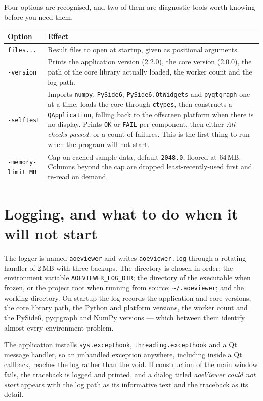 \documentclass[11pt,a4paper,oneside]{report}
\newcommand{\appver}{2.2.0}
\newcommand{\code}[1]{\texttt{#1}}
\begin{document}
Four options are recognised, and two of them are diagnostic tools worth knowing
before you need them.

\begin{center}
\small
\begin{tabular}{@{}p{}p{}@{}}
\toprule
\textbf{Option} & \textbf{Effect} \\
\midrule
\code{files...} & Result files to open at startup, given as positional arguments. \\
\addlinespace
\code{-version} & Prints the application version (\appver), the core version
  (2.0.0), the path of the core library actually loaded, the worker count and
  the log path. \\
\addlinespace
\code{-selftest} & Imports \code{numpy}, \code{PySide6},
  \code{PySide6.QtWidgets} and \code{pyqtgraph} one at a time, loads the core
  through \code{ctypes}, then constructs a \code{QApplication}, falling back to
  the offscreen platform when there is no display. Prints \code{OK} or
  \code{FAIL} per component, then either \emph{All checks passed.} or a count of
  failures. This is the first thing to run when the program will not start. \\
\addlinespace
\code{-memory-limit MB} & Cap on cached sample data, default \code{2048.0},
  floored at 64\,MB. Columns beyond the cap are dropped least-recently-used
  first and re-read on demand. \\
\bottomrule
\end{tabular}
\end{center}

\section{Logging, and what to do when it will not start}

The logger is named \code{aoeviewer} and writes \code{aoeviewer.log} through a
rotating handler of 2\,MB with three backups. The directory is chosen in order:
the environment variable \code{AOEVIEWER\_LOG\_DIR}; the directory of the
executable when frozen, or the project root when running from source;
\code{\textasciitilde/.aoeviewer}; and the working directory. On startup the log
records the application and core versions, the core library path, the Python and
platform versions, the worker count and the PySide6, pyqtgraph and NumPy
versions --- which between them identify almost every environment problem.

The application installs \code{sys.excepthook},
\code{threading.excepthook} and a Qt message handler, so an unhandled exception
anywhere, including inside a Qt callback, reaches the log rather than the void.
If construction of the main window fails, the traceback is logged and printed,
and a dialog titled \emph{aoeViewer could not start} appears with the log path as
its informative text and the traceback as its detail.
\end{document}
